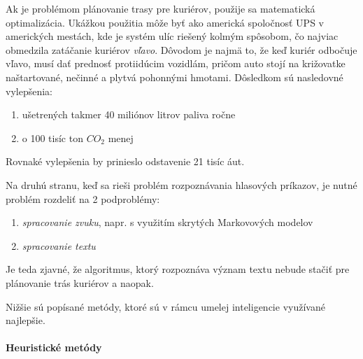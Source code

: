Ak je problémom plánovanie trasy pre kuriérov, použije sa matematická optimalizácia.
Ukážkou použitia môže byť ako americká spoločnosť UPS v amerických mestách, kde je systém ulíc riešený kolmým spôsobom,
čo najviac obmedzila zatáčanie kuriérov \emph{vľavo}.\cite{ups_optimization}
Dôvodom je najmä to, že keď kuriér odbočuje vľavo, musí dať prednosť protiidúcim vozidlám, pričom auto stojí na
križovatke naštartované, nečinné a plytvá pohonnými hmotami.
Dôsledkom sú nasledovné vylepšenia:
\begin{enumerate}
    \item ušetrených takmer 40 miliónov litrov paliva ročne
    \item o 100 tisíc ton $CO_2$ menej
\end{enumerate}
Rovnaké vylepšenia by prinieslo odstavenie 21 tisíc áut.

Na druhú stranu, keď sa rieši problém rozpoznávania hlasových príkazov, je nutné problém rozdeliť na 2 podproblémy:
\begin{enumerate}
    \item \emph{spracovanie zvuku}, napr. s využitím skrytých Markovových modelov\cite{hmm}
    \item \emph{spracovanie textu}\cite{text_analysis}
\end{enumerate}

Je teda zjavné, že algoritmus, ktorý rozpoznáva význam textu nebude stačiť pre plánovanie trás kuriérov a naopak.

Nižšie sú popísané metódy, ktoré sú v rámcu umelej inteligencie využívané najlepšie.

\paragraph{Heuristické metódy}


